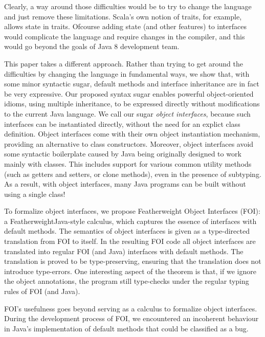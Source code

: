 \noindent Clearly, a way around those difficulties would be to try to
change the language and just remove these limitations. Scala's own
notion of traits, for example, allows state in traits. Ofcourse adding
state (and other features) to interfaces would complicate the language
and require changes in the compiler, and this would go beyond the
goals of Java 8 development team.

This paper takes a different approach. Rather than trying to get
around the difficulties by changing the language in fundamental ways,
we show that, with some minor syntactic sugar, default methods and
interface inheritance are in fact be very expressive. Our proposed
syntax sugar enables powerful object-oriented idioms, using multiple
inheritance, to be expressed directly without modifications to the
current Java language. We call our sugar \emph{object interfaces},
because such interfaces can be instantiated directly, without the need
for an explict class definition. Object interfaces come with their own
object instantiation mechanism, providing an alternative to class
constructors. Moreover, object interfaces avoid some syntactic
boilerplate caused by Java being originally designed to work mainly
with classes. This includes support for various common utility methods
(such as getters and setters, or clone methods), even in the presence
of subtyping. As a result, with object interfaces, many Java programs
can be built without using a single class!  

To formalize object interfaces, we propose Featherweight Object
Interfaces (FOI): 
a FeatherweightJava-style calculus, which captures the essence 
of interfaces with default methods. The semantics of object interfaces 
is given as a type-directed translation from FOI to itself. 
In the resulting FOI code all object interfaces are translated into 
regular FOI (and Java) interfaces with default methods. The translation 
is proved to be type-preserving, ensuring that the translation does 
not introduce type-errors. One interesting aspect of the theorem is that, 
if we ignore the object annotations, the program still type-checks 
under the regular typing rules of FOI (and Java).

FOI's usefulness goes beyond serving as a calculus to formalize object
interfaces. During the development process of FOI, we encountered an 
incoherent behaviour in Java's implementation of default methods that 
could be classified as a bug. 

